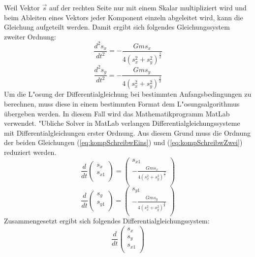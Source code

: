 \begin{refsection}
Weil Vektor $\vec{s}$ auf der rechten Seite nur mit einem Skalar multipliziert wird und beim Ableiten eines Vektors jeder Komponent einzeln abgeleitet wird, kann die Gleichung aufgeteilt werden.
Damit ergibt sich folgendes Gleichungssystem zweiter Ordnung:
\begin{equation} \label{eq:kompSchreibwEins}
\frac{d^2s_x}{dt^2}=-\frac{G m s_x}{4(s_x^2 + s_y^2)^\frac32}
\end{equation}
\begin{equation} \label{eq:kompSchreibwZwei}
\frac{d^2s_y}{dt^2}=-\frac{G m s_y}{4(s_x^2 + s_y^2)^\frac32}
\end{equation}
Um die L"osung der Differentialgleichung bei bestimmten Anfangsbedingungen zu berechnen, muss diese in einem bestimmten Format dem L"osungsalgorithmus übergeben werden.
In diesem Fall wird das Mathematikprogramm MatLab verwendet. 
"Ubliche Solver in MatLab verlangen Differentialgleichungssysteme mit Differentialgleichungen erster Ordnung.
Aus diesem Grund muss die Ordnung der beiden Gleichungen (\ref{eq:kompSchreibwEins}) und (\ref{eq:kompSchreibwZwei}) reduziert werden.
\begin{equation}
\frac{d}{dt} \begin{pmatrix}
s_x \\ 
s_{x1}\\
\end{pmatrix} = \begin{pmatrix}
s_{x1} \\ 
-\frac{G m s_x}{4(s_x^2 + s_y^2)^\frac32} \\
\end{pmatrix}
\end{equation}
\begin{equation}
\frac{d}{dt} \begin{pmatrix}
s_y \\ 
s_{y1}\\
\end{pmatrix} = \begin{pmatrix}
s_{y1} \\ 
-\frac{G m s_y}{4(s_x^2 + s_y^2)^\frac32} \\
\end{pmatrix}
\end{equation}
Zusammengesetzt ergibt sich folgendes Differentialgleichungssystem:
\begin{equation}
\frac{d}{dt} \begin{pmatrix}
s_x \\ 
s_y \\
s_{x1}\\

\end{pmatrix}
\end{equation}
\end{refsection}
